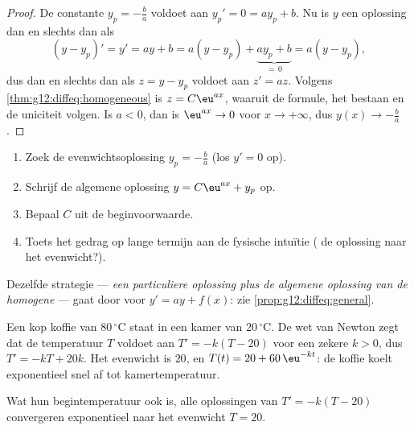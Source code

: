 \begin{proof}
De constante $y_p = -\frac{b}{a}$ voldoet aan $y_p' = 0 = a y_p + b$. Nu is
$y$ een oplossing dan en slechts dan als
\[
(y - y_p)' = y' = ay + b = a(y - y_p) + \underbrace{a y_p + b}_{=\,0}
= a (y - y_p),
\]
dus dan en slechts dan als $z = y - y_p$ voldoet aan $z' = az$. Volgens
\cref{thm:g12:diffeq:homogeneous} is $z = C\eu^{ax}$, waaruit de formule, het
bestaan en de uniciteit volgen. Is $a < 0$, dan is $\eu^{ax} \to 0$ voor
$x \to +\infty$, dus $y(x) \to -\frac ba$.
\end{proof}

\begin{method}[$y' = ay + b$ met een beginvoorwaarde oplossen]\label{met:g12:diffeq:solve}
\begin{enumerate}
  \item Zoek de evenwichtsoplossing $y_p = -\frac{b}{a}$ (los $y' = 0$ op).
  \item Schrijf de algemene oplossing $y = C\eu^{ax} + y_p$ op.
  \item Bepaal $C$ uit de beginvoorwaarde.
  \item Toets het gedrag op lange termijn aan de fysische intuïtie
        ( de oplossing naar het evenwicht?).
\end{enumerate}
Dezelfde strategie --- \emph{een particuliere oplossing plus de algemene
oplossing van de homogene } --- gaat door voor $y' = ay + f(x)$:
zie \cref{prop:g12:diffeq:general}.
\end{method}

\begin{example}\label{ex:g12:diffeq:cooling}
Een kop koffie van $80\,^\circ$C staat in een kamer van $20\,^\circ$C. De wet
van Newton zegt dat de temperatuur $T$ voldoet aan $T' = -k(T - 20)$ voor een
zekere $k > 0$, dus $T' = -kT + 20k$. Het evenwicht is $20$, en
$T(t) = 20 + 60\,\eu^{-kt}$: de koffie koelt exponentieel snel af tot
kamertemperatuur.
\end{example}

\begin{omfigure}

{\small Wat hun begintemperatuur ook is, alle oplossingen van
$T' = -k(T - 20)$ convergeren exponentieel naar het evenwicht $T = 20$.}
\end{omfigure}

